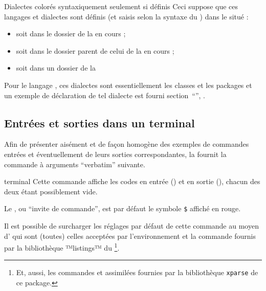 \documentclass{letgut}
\begin{document}
\begin{dbwarning}{Dialectes colorés syntaxiquement seulement si définis}{}
  Ceci suppose que ces langages et dialectes sont définis (et saisis selon la
  syntaxe du ) dans le  situé :
  \begin{itemize}
  \item soit dans le dossier de la  en cours ;
  \item soit dans le dossier parent de celui de la  en cours ;
  \item soit  dans un dossier de la \tds{}
  \end{itemize}
\end{dbwarning}

Pour le langage , ces dialectes sont essentiellement les classes et
les packages  et un exemple de déclaration de tel dialecte est
fourni section~\enquote{},
.

\subsection{Entrées et sorties dans un terminal}
\label{sec:entrees-sorties}

Afin de présenter aisément et de façon homogène des exemples de commandes
entrées et éventuellement de leurs sorties correspondantes, la 
fournit la commande à arguments \enquote{verbatim} suivante.

\begin{docCommand}{terminal}{}
  Cette commande affiche les codes en entrée () et en sortie
  (), chacun des deux étant possiblement vide.

  Le , ou \enquote{invite de commande}, est par défaut le symbole
  \texttt{\$} affiché en rouge.

  Il est possible de surcharger les réglages par défaut de cette commande au
  moyen d' qui sont (toutes) celles acceptées par l'environnement
   et la commande 
  fournis par la bibliothèque ™listings™ du \footnote{Et,
    aussi, les commandes  et assimilées
    fournies par la bibliothèque \lstinline+xparse+ de ce package.}.
\end{docCommand}
\end{document}

